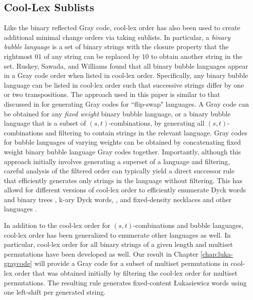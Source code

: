 



\subsection{Cool-Lex Sublists}

Like the binary reflected Gray code, cool-lex order has also been used to create additional minimal change orders via taking sublists. In particular, a \emph{binary bubble language} is a set of binary strings with the closure property that the rightmost $01$ of any string can be replaced by $10$ to obtain another string in the set.  Ruskey, Sawada, and Williams found that all binary bubble languages appear in a Gray code order when listed in cool-lex order.  Specifically, any binary bubble language can be listed in cool-lex order such that successive strings differ by one or two transpositions.  The approach used in this paper is similar to that discussed in \cite{sawada2021inside} for generating Gray codes for ``flip-swap" languages.  A Gray code can be obtained for any \emph{fixed weight} binary bubble language, or a binary bubble language that is a subset of $(s,t)$-combinations, by generating all $(s,t)$-combinations and filtering to contain strings in the relevant language.  Gray codes for bubble languages of varying weights can be obtained by concatenating fixed weight binary bubble language Gray codes together.
Importantly, although this approach initially involves generating a superset of a language and filtering, careful analysis of the filtered order can typically yield a direct successor rule that efficiently generates only strings in the language without filtering.  This has allowd for different versions of cool-lex order to efficiently enumerate Dyck words and binary trees \cite{ruskey2008generating}, k-ary Dyck words, \cite{durocher2012cool}, and fixed-density necklaces and other languages \cite{sawada2009fixed}.  

In addition to the cool-lex order for $(s,t)$-combinations and bubble languages, cool-lex order has been generalized to enumerate other languages as well.  In particular, cool-lex order for all binary strings of a given length \cite{stevens2012coolest} and multiset permutations \cite{williams2009loopless} have been developed as well.  Our result in Chapter \ref{chap:luka-graycode} will provide a Gray code for a subset of multiset permutations in cool-lex order that was obtained initially by filtering the cool-lex order for multiset permutations.  The resulting rule generates fixed-content Łukasiewicz words using one left-shift per generated string.


